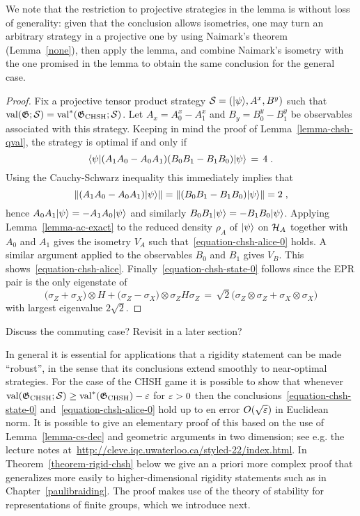 We note that the restriction to projective strategies in the lemma is without loss of generality: given that the conclusion allows isometries, one may turn an arbitrary strategy in a projective one by using Naimark's theorem (Lemma~\ref{none}), then apply the lemma, and combine Naimark's isometry with the one promised in the lemma to obtain the same conclusion for the general case. 


\begin{proof}
Fix a  projective tensor product strategy $\mathcal{S} = (|\psi\rangle,A^x,B^y)$ such that $\mathrm{val}(\mathfrak{G};\mathcal{S})=\mathrm{val}^{*}(\mathfrak{G}_{\mathrm{CHSH}};\mathcal{S})$. Let $A_x = A^x_0-A^x_1$ and $B_y = B^y_0-B^y_1$ be observables associated with this strategy.
Keeping in mind the proof of Lemma~\ref{lemma-chsh-qval}, the strategy is optimal if and only if 
\begin{equation}\label{equation-exact-1}
\langle\psi|(A_1A_0-A_0A_1) (B_0B_1-B_1B_0)|\psi\rangle \,=\, 4\;.
\end{equation}
Using the Cauchy-Schwarz inequality this immediately implies that 
\[\|(A_1A_0-A_0A_1) |\psi\rangle\|=\|(B_0B_1-B_1B_0)|\psi\rangle\|=2\;,\]
hence $A_0A_1 |\psi\rangle = - A_1 A_0 |\psi\rangle$ and similarly $B_0B_1 |\psi\rangle = - B_1 B_0 |\psi\rangle$. Applying Lemma~\ref{lemma-ac-exact} to the reduced density $\rho_A$ of $|\psi\rangle$ on $\mathcal{H}_A$ together with $A_0$ and $A_1$ gives the isometry $V_A$ such that~\eqref{equation-chsh-alice-0} holds. A similar argument applied to the observables $B_0$ and $B_1$ gives $V_B$. This shows~\eqref{equation-chsh-alice}. Finally~\eqref{equation-chsh-state-0} follows since the EPR pair is the only eigenstate of 
\[ \big(\sigma_Z  + \sigma_X \big) \otimes H + \big(\sigma_Z - \sigma_X\big) \otimes \sigma_Z H \sigma_Z \,=\, \sqrt{2}\big( \sigma_Z \otimes \sigma_Z + \sigma_X \otimes \sigma_X \big)\]
with largest eigenvalue $2\sqrt{2}$. 
\end{proof}

\begin{remark} Discuss the commuting case? Revisit in a later section? 
\end{remark}


In general it is essential for applications that a rigidity statement can be made ``robust'', in the sense that its conclusions extend smoothly to near-optimal strategies. For the case of the CHSH game it is possible to show that whenever $\mathrm{val}(\mathfrak{G}_{\mathrm{CHSH}};\mathcal{S})\geq\mathrm{val}^*(\mathfrak{G}_{\mathrm{CHSH}})-\varepsilon$ for $\varepsilon>0$ then the conclusions~\eqref{equation-chsh-state-0} and~\eqref{equation-chsh-alice-0} hold up to en error $O(\sqrt{\varepsilon})$ in Euclidean norm. 
It is possible to give an elementary proof of this based on the use of Lemma~\ref{lemma-cs-dec} and geometric arguments in two dimension; see e.g. the lecture notes at~\url{http://cleve.iqc.uwaterloo.ca/styled-22/index.html}. In Theorem~\ref{theorem-rigid-chsh} below we give an a priori more complex proof that generalizes more easily to higher-dimensional rigidity statements such as in Chapter~\ref{paulibraiding}. The proof makes use of the theory of stability for representations of finite groups, which we introduce next. 




